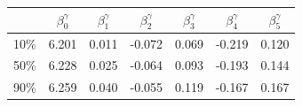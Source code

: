 \begin{tabular}{ccccccc}
\hline
 & $\beta_0^{\gamma}$ & $\beta_1^{\gamma}$ & $\beta_2^{\gamma}$ & $\beta_3^{\gamma}$ & $\beta_4^{\gamma}$ & $\beta_5^{\gamma}$ \\
\hline
10\% & 6.201 & 0.011 & -0.072 & 0.069 & -0.219 & 0.120 \\
50\% & 6.228 & 0.025 & -0.064 & 0.093 & -0.193 & 0.144 \\
90\% & 6.259 & 0.040 & -0.055 & 0.119 & -0.167 & 0.167 \\
\hline
\end{tabular}
